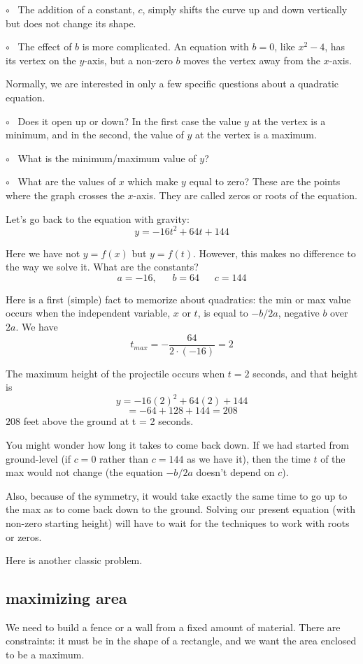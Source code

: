 \documentclass[11pt, oneside]{article}
\begin{document}
$\circ$ \ The addition of a constant, $c$, simply shifts the curve up and down vertically but does not change its shape.

$\circ$ \ The effect of $b$ is more complicated.  An equation with $b = 0$, like $x^2 - 4$, has its vertex on the $y$-axis, but a non-zero $b$ moves the vertex away from the $x$-axis.

Normally, we are interested in only a few specific questions about a quadratic equation.  

$\circ$ \ Does it open up or down?  In the first case the value $y$ at the vertex is a minimum, and in the second, the value of $y$ at the vertex is a maximum.

$\circ$ \ What is the minimum/maximum value of $y$?

$\circ$ \ What are the values of $x$ which make $y$ equal to zero?  These are the points where the graph crosses the $x$-axis.  They are called zeros or roots of the equation.

Let's go back to the equation with gravity:
\[ y = -16t^2 + 64t + 144 \]

Here we have not $y = f(x)$ but $y = f(t)$.  However, this makes no difference to the way we solve it.  What are the constants?
\[ a = - 16, \ \ \ \ \ \ \ b = 64 \ \ \ \ \ \ \ c = 144 \]

Here is a first (simple) fact to memorize about quadratics:  the min or max value occurs when the independent variable, $x$ or $t$, is equal to $-b/2a$, negative $b$ over $2a$.  We have
\[ t_{max} = - \frac{64}{2 \cdot (-16)} = 2 \]

The maximum height of the projectile occurs when $t = 2$ seconds, and that height is
\[ y = -16(2)^2 + 64(2) + 144 \]
\[ = -64 + 128 + 144 = 208 \]
$208$ feet above the ground at t = 2 seconds.

You might wonder how long it takes to come back down.  If we had started from ground-level (if $c = 0$ rather than $c = 144$ as we have it), then the time $t$ of the max would not change (the equation $-b/2a$ doesn't depend on $c$).

Also, because of the symmetry, it would take exactly the same time to go up to the max as to come back down to the ground.  Solving our present equation (with non-zero starting height) will have to wait for the techniques to work with roots or zeros.

Here is another classic problem.

\subsection*{maximizing area}
We need to build a fence or a wall from a fixed amount of material.  There are constraints:   it must be in the shape of a rectangle, and we want the area enclosed to be a maximum.
\end{document}
